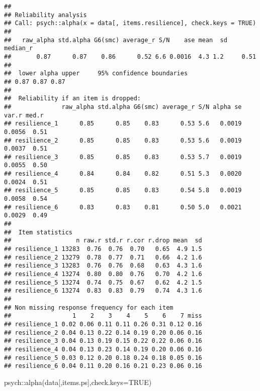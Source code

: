 \documentclass[
]{article}
\newenvironment{Shaded}{\begin{snugshade}}{\end{snugshade}}
\newcommand{\AttributeTok}[1]{\textcolor[rgb]{0.77,0.63,0.00}{#1}}
\newcommand{\ConstantTok}[1]{\textcolor[rgb]{0.00,0.00,0.00}{#1}}
\newcommand{\FunctionTok}[1]{\textcolor[rgb]{0.00,0.00,0.00}{#1}}
\newcommand{\NormalTok}[1]{#1}
\newcommand{\SpecialCharTok}[1]{\textcolor[rgb]{0.00,0.00,0.00}{#1}}
\begin{document}
\begin{verbatim}
## 
## Reliability analysis   
## Call: psych::alpha(x = data[, items.resilience], check.keys = TRUE)
## 
##   raw_alpha std.alpha G6(smc) average_r S/N    ase mean  sd median_r
##       0.87      0.87    0.86      0.52 6.6 0.0016  4.3 1.2     0.51
## 
##  lower alpha upper     95% confidence boundaries
## 0.87 0.87 0.87 
## 
##  Reliability if an item is dropped:
##              raw_alpha std.alpha G6(smc) average_r S/N alpha se  var.r med.r
## resilience_1      0.85      0.85    0.83      0.53 5.6   0.0019 0.0056  0.51
## resilience_2      0.85      0.85    0.83      0.53 5.6   0.0019 0.0037  0.51
## resilience_3      0.85      0.85    0.83      0.53 5.7   0.0019 0.0055  0.50
## resilience_4      0.84      0.84    0.82      0.51 5.3   0.0020 0.0024  0.51
## resilience_5      0.85      0.85    0.83      0.54 5.8   0.0019 0.0058  0.54
## resilience_6      0.83      0.83    0.81      0.50 5.0   0.0021 0.0029  0.49
## 
##  Item statistics 
##                  n raw.r std.r r.cor r.drop mean  sd
## resilience_1 13283  0.76  0.76  0.70   0.65  4.9 1.5
## resilience_2 13279  0.78  0.77  0.71   0.66  4.2 1.6
## resilience_3 13283  0.76  0.76  0.68   0.63  4.3 1.6
## resilience_4 13274  0.80  0.80  0.76   0.70  4.2 1.6
## resilience_5 13274  0.74  0.75  0.67   0.62  4.2 1.5
## resilience_6 13274  0.83  0.83  0.79   0.74  4.3 1.6
## 
## Non missing response frequency for each item
##                 1    2    3    4    5    6    7 miss
## resilience_1 0.02 0.06 0.11 0.11 0.26 0.31 0.12 0.16
## resilience_2 0.04 0.13 0.22 0.14 0.19 0.20 0.06 0.16
## resilience_3 0.04 0.13 0.19 0.15 0.22 0.22 0.06 0.16
## resilience_4 0.04 0.13 0.23 0.14 0.19 0.20 0.06 0.16
## resilience_5 0.03 0.12 0.20 0.18 0.24 0.18 0.05 0.16
## resilience_6 0.04 0.11 0.20 0.16 0.21 0.23 0.06 0.16
\end{verbatim}

\begin{Shaded}
\begin{Highlighting}[]
\NormalTok{psych}\SpecialCharTok{::}\FunctionTok{alpha}\NormalTok{(data[,items.ps],}\AttributeTok{check.keys=}\ConstantTok{TRUE}\NormalTok{)}
\end{Highlighting}
\end{Shaded}
\end{document}
